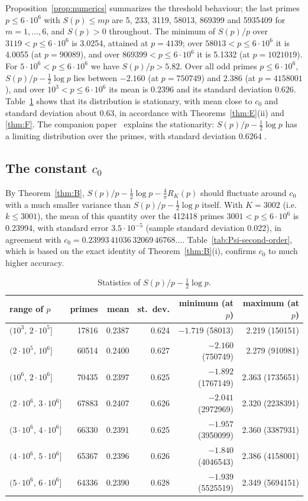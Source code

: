 Proposition~\ref{prop:numerics} summarizes the threshold behaviour; the last primes $p\le6\cdot10^6$ with $S(p)\le mp$ are 5, 233, 3119, 58013, 869399 and 5935409 for $m=1,\dots,6$, and $S(p)>0$ throughout. The minimum of $S(p)/p$ over $3119<p\le 6\cdot 10^6$ is 3.0254, attained at $p=4139$; over $58013<p\le 6\cdot 10^6$ it is 4.0055 (at $p=90089$), and over $869399<p\le 6\cdot 10^6$ it is 5.1332 (at $p=1021019$). For $5\cdot10^6<p\le6\cdot10^6$ we have $S(p)/p>5.82$. Over all odd primes $p\le6\cdot10^6$, $S(p)/p-\frac12\log p$ lies between $-2.160$ (at $p=750749$) and $2.386$ (at $p=4158001$), and over $10^3<p\le6\cdot10^6$ its mean is $0.2396$ and its standard deviation $0.626$. Table~\ref{tab:statistics} shows that its distribution is stationary, with mean close to $c_0$ and standard deviation about 0.63, in accordance with Theorems~\ref{thm:E}(ii) and \ref{thm:F}. The companion paper~\cite{b32} explains the stationarity: $S(p)/p-\frac12\log p$ has a limiting distribution over the primes, with standard deviation $0.6264$ \cite[Remark~3.5]{b32}.

\subsection{\texorpdfstring{The constant $c_0$}{The constant c0}}\label{subsec:constant-c0}
By Theorem~\ref{thm:B}, $S(p)/p-\frac12\log p-\frac4\pi R_K(p)$ should fluctuate around $c_0$ with a much smaller variance than $S(p)/p-\frac12\log p$ itself. With $K=3002$ (i.e.\ $k\le 3001$), the mean of this quantity over the 412418 primes $3001<p\le 6\cdot 10^6$ is 0.23994, with standard error $3.5\cdot 10^{-5}$ (sample standard deviation 0.022), in agreement with $c_0=0.23993\,41036\,32069\,46768\ldots$. Table~\ref{tab:Psi-second-order}, which is based on the exact identity of Theorem~\ref{thm:B}(i), confirms $c_0$ to much higher accuracy.

\begin{table}[ht]
\small
\begin{tabular}{lrrrrr}
\toprule
range of $p$ & primes & mean & st.\ dev. & minimum (at $p$) & maximum (at $p$)\\
\midrule
$(10^3,\,2\cdot 10^5]$ & 17816 & 0.2387 & 0.624 & $-1.719$ (58013) & 2.219 (150151)\\
$(2\cdot 10^5,\,10^6]$ & 60514 & 0.2400 & 0.627 & $-2.160$ (750749) & 2.279 (910981)\\
$(10^6,\,2\cdot 10^6]$ & 70435 & 0.2397 & 0.625 & $-1.892$ (1767149) & 2.363 (1735651)\\
$(2\cdot 10^6,\,3\cdot 10^6]$ & 67883 & 0.2407 & 0.626 & $-2.041$ (2972969) & 2.320 (2238391)\\
$(3\cdot 10^6,\,4\cdot 10^6]$ & 66330 & 0.2391 & 0.625 & $-1.957$ (3950099) & 2.360 (3387931)\\
$(4\cdot 10^6,\,5\cdot 10^6]$ & 65367 & 0.2396 & 0.626 & $-1.840$ (4046543) & 2.386 (4158001)\\
$(5\cdot 10^6,\,6\cdot 10^6]$ & 64336 & 0.2390 & 0.628 & $-1.939$ (5525519) & 2.349 (5694151)\\
\bottomrule
\end{tabular}
\caption{Statistics of $S(p)/p-\frac12\log p$.}\label{tab:statistics}
\end{table}

